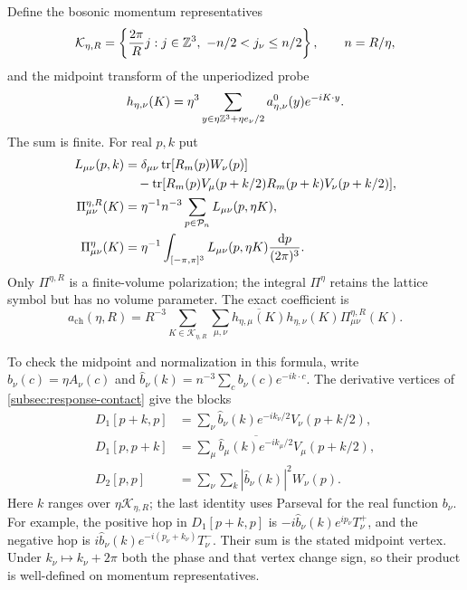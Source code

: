Define the bosonic momentum representatives
\[
 \mathcal K_{\eta,R}=
 \left\{\frac{2\pi}{R}j:j\in\mathbb Z^3,\ -n/2<j_\nu\le n/2\right\},
                   \qquad n=R/\eta,
\]
and the midpoint transform of the unperiodized probe
\begin{equation}\label{eq:response-midpoint-transform}
 h_{\eta,\nu}(K)=\eta^3
       \sum_{y\in\eta\mathbb Z^3+\eta e_\nu/2}
                     a_{\eta,\nu}^0(y)e^{-iK\cdot y}.
\end{equation}
The sum is finite. For real $p,k$ put
\begin{align}
 L_{\mu\nu}(p,k)
  &=\delta_{\mu\nu}\operatorname{tr}[R_m(p)W_\nu(p)]\notag\\
  &\quad-\operatorname{tr}[R_m(p)V_\mu(p+k/2)
                     R_m(p+k)V_\nu(p+k/2)],\label{eq:response-polarization-integrand}\\
 \Pi^{\eta,R}_{\mu\nu}(K)
  &=\eta^{-1}n^{-3}\sum_{p\in\mathcal P_n}
                       L_{\mu\nu}(p,\eta K),\notag\\
 \Pi^\eta_{\mu\nu}(K)
  &=\eta^{-1}\int_{[-\pi,\pi]^3}
          L_{\mu\nu}(p,\eta K)\frac{\mathrm d p}{(2\pi)^3}.
                                  \label{eq:response-polarization-kernels}
\end{align}
Only $\Pi^{\eta,R}$ is a finite-volume polarization; the integral
$\Pi^\eta$ retains the lattice symbol but has no volume parameter.
The exact coefficient is
\begin{equation}\label{eq:response-polarization-identity}
 a_{\mathrm{ch}}(\eta,R)
    =R^{-3}\sum_{K\in\mathcal K_{\eta,R}}\sum_{\mu,\nu}
       \overline{h_{\eta,\mu}(K)}h_{\eta,\nu}(K)
                                      \Pi^{\eta,R}_{\mu\nu}(K).
\end{equation}

To check the midpoint and normalization in this formula, write
$b_\nu(c)=\eta A_\nu(c)$ and
$\widehat b_\nu(k)=n^{-3}\sum_cb_\nu(c)e^{-ik\cdot c}$.
The derivative vertices of \cref{subsec:response-contact}
give the blocks
\begin{align*}
 D_1[p+k,p]&=\sum_\nu\widehat b_\nu(k)e^{-ik_\nu/2}
                                          V_\nu(p+k/2),\\
 D_1[p,p+k]&=\sum_\mu
         \overline{\widehat b_\mu(k)e^{-ik_\mu/2}}
                                          V_\mu(p+k/2),\\
 D_2[p,p]&=\sum_\nu\sum_k|\widehat b_\nu(k)|^2W_\nu(p).
\end{align*}
Here $k$ ranges over $\eta\mathcal K_{\eta,R}$; the last
identity uses Parseval for the real function $b_\nu$.
For example, the positive hop in $D_1[p+k,p]$ is
$-i\widehat b_\nu(k)e^{ip_\nu}T_\nu^+$, and the negative hop
is $i\widehat b_\nu(k)e^{-i(p_\nu+k_\nu)}T_\nu^-$.
Their sum is the stated midpoint vertex. Under $k_\nu\mapsto
k_\nu+2\pi$ both the phase and that vertex change sign, so
their product is well-defined on momentum representatives.


